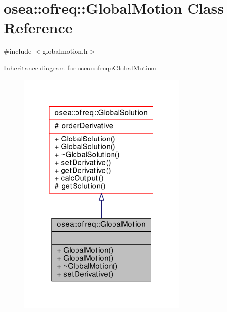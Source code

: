 \hypertarget{classosea_1_1ofreq_1_1_global_motion}{\section{osea\-:\-:ofreq\-:\-:Global\-Motion Class Reference}
\label{classosea_1_1ofreq_1_1_global_motion}
}


{\ttfamily \#include $<$globalmotion.\-h$>$}



Inheritance diagram for osea\-:\-:ofreq\-:\-:Global\-Motion\-:
\nopagebreak
\begin{figure}[H]
\begin{center}
\leavevmode
\includegraphics[width=236pt]{classosea_1_1ofreq_1_1_global_motion__inherit__graph}
\end{center}
\end{figure}
